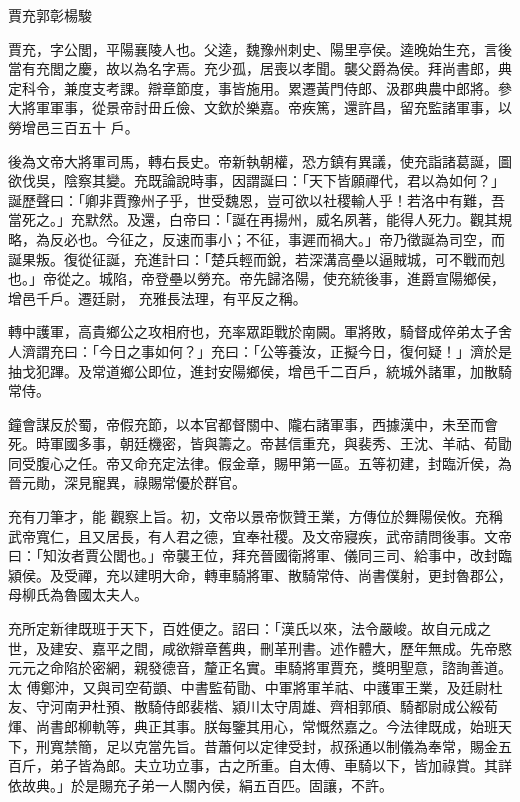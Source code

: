 
\begin{pinyinscope}

 賈充郭彰楊駿



 賈充，字公閭，平陽襄陵人也。父逵，魏豫州刺史、陽里亭侯。逵晚始生充，言後當有充閭之慶，故以為名字焉。充少孤，居喪以孝聞。襲父爵為侯。拜尚書郎，典定科令，兼度支考課。辯章節度，事皆施用。累遷黃門侍郎、汲郡典農中郎將。參大將軍軍事，從景帝討毌丘儉、文欽於樂嘉。帝疾篤，還許昌，留充監諸軍事，以勞增邑三百五十
 戶。



 後為文帝大將軍司馬，轉右長史。帝新執朝權，恐方鎮有異議，使充詣諸葛誕，圖欲伐吳，陰察其變。充既論說時事，因謂誕曰：「天下皆願禪代，君以為如何？」誕歷聲曰：「卿非賈豫州子乎，世受魏恩，豈可欲以社稷輸人乎！若洛中有難，吾當死之。」充默然。及還，白帝曰：「誕在再揚州，威名夙著，能得人死力。觀其規略，為反必也。今征之，反速而事小；不征，事遲而禍大。」帝乃徵誕為司空，而誕果叛。復從征誕，充進計曰：「楚兵輕而銳，若深溝高壘以逼賊城，可不戰而剋也。」帝從之。城陷，帝登壘以勞充。帝先歸洛陽，使充統後事，進爵宣陽鄉侯，增邑千戶。遷廷尉，
 充雅長法理，有平反之稱。



 轉中護軍，高貴鄉公之攻相府也，充率眾距戰於南闕。軍將敗，騎督成倅弟太子舍人濟謂充曰：「今日之事如何？」充曰：「公等養汝，正擬今日，復何疑！」濟於是抽戈犯蹕。及常道鄉公即位，進封安陽鄉侯，增邑千二百戶，統城外諸軍，加散騎常侍。



 鐘會謀反於蜀，帝假充節，以本官都督關中、隴右諸軍事，西據漢中，未至而會死。時軍國多事，朝廷機密，皆與籌之。帝甚信重充，與裴秀、王沈、羊祜、荀勖同受腹心之任。帝又命充定法律。假金章，賜甲第一區。五等初建，封臨沂侯，為晉元勛，深見寵異，祿賜常優於群官。



 充有刀筆才，能
 觀察上旨。初，文帝以景帝恢贊王業，方傳位於舞陽侯攸。充稱武帝寬仁，且又居長，有人君之德，宜奉社稷。及文帝寢疾，武帝請問後事。文帝曰：「知汝者賈公閭也。」帝襲王位，拜充晉國衛將軍、儀同三司、給事中，改封臨潁侯。及受禪，充以建明大命，轉車騎將軍、散騎常侍、尚書僕射，更封魯郡公，母柳氏為魯國太夫人。



 充所定新律既班于天下，百姓便之。詔曰：「漢氏以來，法令嚴峻。故自元成之世，及建安、嘉平之間，咸欲辯章舊典，刪革刑書。述作體大，歷年無成。先帝愍元元之命陷於密網，親發德音，釐正名實。車騎將軍賈充，獎明聖意，諮詢善道。太
 傅鄭沖，又與司空荀顗、中書監荀勖、中軍將軍羊祜、中護軍王業，及廷尉杜友、守河南尹杜預、散騎侍郎裴楷、潁川太守周雄、齊相郭頎、騎都尉成公綏荀煇、尚書郎柳軌等，典正其事。朕每鑒其用心，常慨然嘉之。今法律既成，始班天下，刑寬禁簡，足以克當先旨。昔蕭何以定律受封，叔孫通以制儀為奉常，賜金五百斤，弟子皆為郎。夫立功立事，古之所重。自太傅、車騎以下，皆加祿賞。其詳依故典。」於是賜充子弟一人關內侯，絹五百匹。固讓，不許。




\end{pinyinscope}

